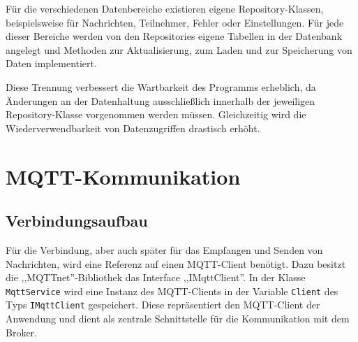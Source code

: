 Für die verschiedenen Datenbereiche existieren eigene Repository-Klassen, beispielsweise für Nachrichten, Teilnehmer, Fehler oder Einstellungen. Für jede dieser Bereiche werden von den Repositories eigene Tabellen in der Datenbank angelegt und Methoden zur Aktualisierung, zum Laden und zur Speicherung von Daten implementiert.

Diese Trennung verbessert die Wartbarkeit des Programms erheblich, da Änderungen an der Datenhaltung ausschließlich innerhalb der jeweiligen Repository-Klasse vorgenommen werden müssen. Gleichzeitig wird die Wiederverwendbarkeit von Datenzugriffen drastisch erhöht.
\section{MQTT-Kommunikation}
\subsection{Verbindungsaufbau}
Für die Verbindung, aber auch später für das Empfangen und Senden von Nachrichten, wird eine Referenz auf einen MQTT-Client benötigt. Dazu besitzt die ,,MQTTnet''-Bibliothek das Interface ,,IMqttClient''. In der Klasse \texttt{MqttService} wird eine Instanz des MQTT-Clients  in der Variable \lstinline|Client| des Typs \lstinline|IMqttClient| gespeichert. 
Diese repräsentiert den MQTT-Client der Anwendung und dient als zentrale Schnittstelle für die Kommunikation mit dem Broker.
 
